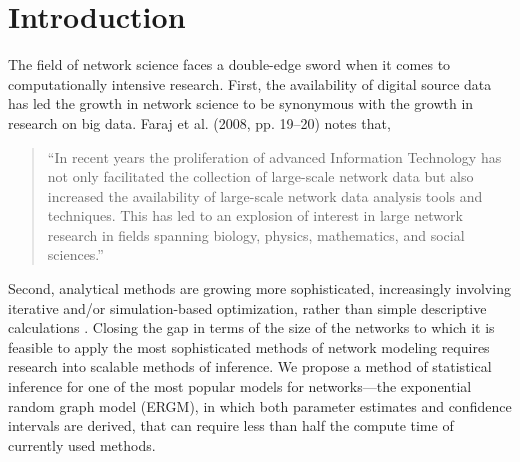 \documentclass[10pt, conference, compsocconf]{IEEEtran}
\begin{document}
\section{Introduction}
The field of network science faces a double-edge sword when it comes to computationally intensive research. First, the availability of digital source data has led the growth in network science to be synonymous with the growth in research on big data.  Faraj et al. (2008, pp. 19--20) \cite{faraj2008electronic} notes that, \begin{quote} ``In recent years the proliferation of advanced Information Technology has not only facilitated the collection of large-scale network data but also increased the availability of large-scale network data analysis tools and techniques. This has led to an explosion of interest in large network research in fields spanning biology, physics, mathematics, and social sciences.''  \end{quote} Second, analytical methods are growing more sophisticated, increasingly involving iterative and/or simulation-based optimization, rather than simple descriptive calculations \cite{snijders2011statistical}.  Closing the gap in terms of the size of the networks to which it is feasible to apply the most sophisticated methods of network modeling requires research into scalable methods of inference. We propose a method of statistical inference for one of the most popular models for networks---the exponential random graph model (ERGM), in which both parameter estimates and confidence intervals are derived, that can require less than half the compute time of currently used methods. 
\end{document}
